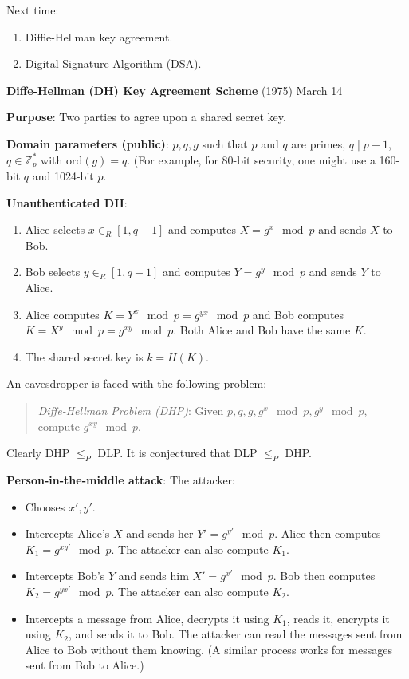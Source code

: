 \documentclass[a4paper,12pt]{article}
\begin{document}
Next time:
\begin{enumerate}
 \item Diffie-Hellman key agreement.
 \item Digital Signature Algorithm (DSA).
\end{enumerate}

\clearpage


{\bf Diffe-Hellman (DH) Key Agreement Scheme } (1975)
\hfill
March 14

{\bf Purpose}: Two parties to agree upon a shared secret key.

{\bf Domain parameters (public)}: $p,q,g$ such that $p$ and $q$ are primes, $q \mid p-1$, $q \in \mathbb{Z}_p^*$ with $\text{ord}(g) = q$. (For example, for 80-bit security, one might use a 160-bit $q$ and 1024-bit $p$.

{\bf Unauthenticated DH}:
\begin{enumerate}[1.]
\item Alice selects $x \in_R [1,q-1]$ and computes $X = g^x \mod p$ and sends $X$ to Bob.
\item Bob selects $y \in_R [1,q-1]$ and computes $Y = g^y \mod p$ and sends $Y$ to Alice.
\item Alice computes $K = Y^x \mod p = g^{yx} \mod p$ and Bob computes $K = X^y \mod p = g^{xy} \mod p$. Both Alice and Bob have the same $K$.
\item The shared secret key is $k = H(K)$.
\end{enumerate}
An eavesdropper is faced with the following problem:
\begin{quote}
\emph{Diffe-Hellman Problem (DHP)}: Given $p,q,g,g^x \mod p, g^y \mod p$, compute $g^{xy} \mod p$.
\end{quote}
Clearly DHP $\le_P$ DLP. It is conjectured that DLP $\le_P$ DHP.

{\bf Person-in-the-middle attack}: The attacker:
\begin{itemize}
\item Chooses $x',y'$. 
\item Intercepts Alice's $X$ and sends her $Y' = g^{y'} \mod p$. Alice then computes $K_1 = g^{xy'} \mod p$. The attacker can also compute $K_1$.
\item Intercepts Bob's $Y$ and sends him $X' = g^{x'} \mod p$. Bob then computes $K_2 = g^{yx'} \mod p$. The attacker can also compute $K_2$.
\item Intercepts a message from Alice, decrypts it using $K_1$, reads it, encrypts it using $K_2$, and sends it to Bob. The attacker can read the messages sent from Alice to Bob without them knowing. (A similar process works for messages sent from Bob to Alice.)
\end{itemize}
\end{document}
